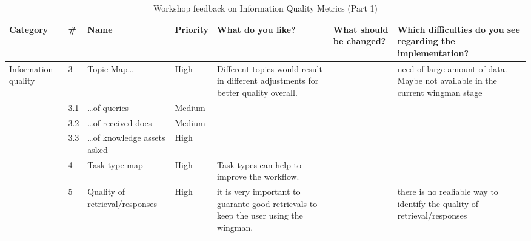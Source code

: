 \documentclass[
	english,
	ruledheaders=section,%
	class=report,%
	thesis={type=bachelor},%
	accentcolor=1b,%
	custommargins=true,%
	marginpar=false,%
	parskip=half-,%
	fontsize=11pt,%
	DIV=14,
]{tudapub}
\begin{document}
\begin{table}
    \centering
    \small 
    \caption{Workshop feedback on Information Quality Metrics (Part 1)}
    \label{tab:info_quality_p1}
    \begin{tabularx}{\textheight}{p{2.2cm} l >{\RaggedRight\arraybackslash}X l >{\RaggedRight\arraybackslash}X >{\RaggedRight\arraybackslash}X >{\RaggedRight\arraybackslash}X}
        \toprule
        \textbf{Category} & \textbf{\#} & \textbf{Name} & \textbf{Priority} & \textbf{What do you like?} & \textbf{What should be changed?} & \textbf{Which difficulties do you see regarding the implementation?} \\
        \midrule
        \multirow{6}{=}{Information quality} 
        & 3 & Topic Map\dots & High & Different topics would result in different adjustments for better quality overall. & & need of large amount of data. Maybe not available in the current wingman stage \\
        \cmidrule(l){2-7}
        & 3.1 & \dots of queries & Medium & & & \\
        \cmidrule(l){2-7}
        & 3.2 & \dots of received docs & Medium & & & \\
        \cmidrule(l){2-7}
        & 3.3 & \dots of knowledge assets asked & High & & & \\
        \cmidrule(l){2-7}
        & 4 & Task type map & High & Task types can help to improve the workflow. & & \\
        \cmidrule(l){2-7}
        & 5 & Quality of retrieval/responses & High & it is very important to guarante good retrievals to keep the user using the wingman. & & there is no realiable way to identify the quality of retrieval/responses \\
        \bottomrule
    \end{tabularx}
\end{table}
\end{document}
